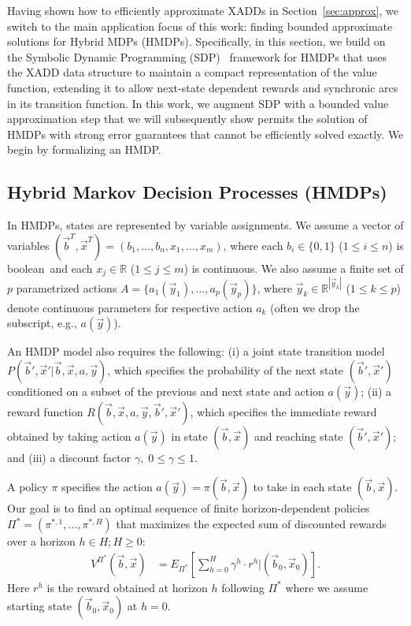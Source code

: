 \label{sec:basdp}

Having shown how to efficiently approximate XADDs in
Section~\ref{sec:approx}, we switch to the main application focus of
this work: finding bounded approximate solutions for Hybrid MDPs
(HMDPs).  Specifically, in this section, we build on the Symbolic
Dynamic Programming (SDP)~\cite{sanner_uai11,zamani12} framework for
HMDPs that uses the XADD data structure to maintain a compact
representation of the value function, extending it to allow next-state
dependent rewards and synchronic arcs in its transition function.  In
this work, we augment SDP with a bounded value approximation step that
we will subsequently show permits the solution of HMDPs with strong
error guarantees that cannot be efficiently solved exactly.  We begin by
formalizing an HMDP.

\subsection{Hybrid Markov Decision Processes (HMDPs) }

In HMDPs, states are represented by variable assignments. We assume a
vector of variables $(\vec{b}^T,\vec{x}^T) = (
b_1,\ldots,b_n,x_{1},\ldots,x_m )$, where each $b_i \in \{ 0,1 \}$
($1 \leq i \leq n$) is boolean$\,$ and each $x_j \in \mathbb{R}$
($1 \leq j \leq m$) is continuous. We also assume a finite set of $p$
parametrized actions $A = \{ a_1(\vec{y}_1), \ldots,
a_p(\vec{y}_p) \}$, where $\vec{y}_k \in \mathbb{R}^{|\vec{y}_k|}$
($1 \leq k \leq p$) denote continuous parameters for respective
action $a_k$ (often we drop the subscript, e.g., $a(\vec{y})$).

An HMDP model also requires the following: (i) a joint state transition
model $P(\vec{b}',\vec{x}'|\vec{b},\vec{x},a,\vec{y})$, which specifies the
probability of the next state $(\vec{b}',\vec{x}')$ conditioned on a
subset of the previous and next state and action $a(\vec{y})$; (ii) a
reward function $R(\vec{b},\vec{x},a,\vec{y},\vec{b}',\vec{x}')$,
which specifies the immediate reward obtained by taking action
$a(\vec{y})$ in state $(\vec{b},\vec{x})$ and reaching state
$(\vec{b}',\vec{x}')$; and (iii) a discount factor $\gamma, \;
0 \leq \gamma \leq 1$.

A policy $\pi$ specifies the action $a(\vec{y}) =
\pi(\vec{b},\vec{x})$ to take in each state $(\vec{b},\vec{x})$.  Our
goal is to find an optimal sequence of finite horizon-dependent
policies $\Pi^* = (\pi^{*,1},\ldots,\pi^{*,H})$ that
maximizes the expected sum of discounted rewards over a horizon $h \in
H; H \geq 0$:
\begin{align}
V^{\Pi^*}(\vec{b},\vec{x}) & = E_{\Pi^*} \left[ \sum_{h=0}^{H} \gamma^h \cdot r^h \Big| (\vec{b}_0,\vec{x}_0) \right]. \label{eq:vfun_def}
\end{align}
Here $r^h$ is the reward obtained at horizon $h$ following $\Pi^*$
where we assume starting state $(\vec{b}_0,\vec{x}_0)$ at $h=0$.

